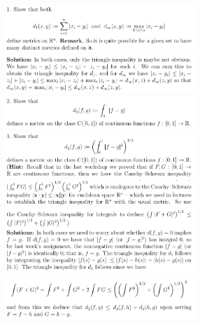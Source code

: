 \documentclass[8pt,landscape]{article}
\begin{document}
\begin{multicols}{3}
    \includegraphics[width=270]{051.png} \\
    \includegraphics[width=270]{052.png} \\
    \includegraphics[width=270]{053.png} \\
    \includegraphics[width=270]{054.png} \\
    \includegraphics[width=270]{055.png} \\
    \includegraphics[width=270]{056.png} \\
    \includegraphics[width=270]{057.png} \\

\end{multicols}
\end{document}
